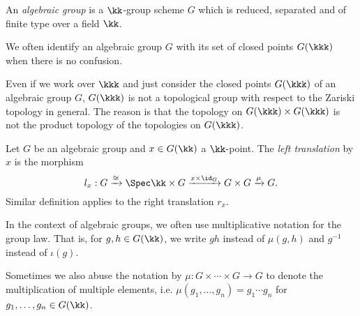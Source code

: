     \begin{definition}\label{def:algebraic_group}
        An \emph{algebraic group} is a \(\kk\)-group scheme \(G\) which is reduced, separated and of finite type over a field \(\kk\).
    \end{definition}

    \begin{remark}\label{rmk:algebraic_group_and_its_closed_points}
        We often identify an algebraic group \(G\) with its set of closed points \(G(\kkk)\) when there is no confusion.
    \end{remark}

    \begin{remark}\label{rmk:algebraic_group_is_not_topological_group}
        Even if we work over \(\kkk\) and just consider the closed points \(G(\kkk)\) of an algebraic group \(G\), \(G(\kkk)\) is not a topological group with respect to the Zariski topology in general.
        The reason is that the topology on \(G(\kkk) \times G(\kkk)\) is not the product topology of the topologies on \(G(\kkk)\).
    \end{remark}

    \begin{definition}\label{def:transition_morphism}
        Let \(G\) be an algebraic group and \(x \in G(\kk)\) a \(\kk\)-point.
        The \emph{left translation} by \(x\) is the morphism
        \[
            l_x: G \xrightarrow{\cong} \Spec \kk \times G \xrightarrow{x \times \id_G} G \times G \xrightarrow{\mu} G.
        \]
        Similar definition applies to the right translation \(r_x\).
    \end{definition}

    \begin{remark}\label{rmk:notation_of_multiplication_and_inverse}
        In the context of algebraic groups, we often use multiplicative notation for the group law.
        That is, for \(g,h \in G(\kk)\), we write \(gh\) instead of \(\mu(g,h)\) and \(g^{-1}\) instead of \(\iota(g)\).
        
        Sometimes we also abuse the notation by \(\mu:G \times \cdots \times G \to G\) to denote the multiplication of multiple elements, i.e. \(\mu(g_1,\ldots,g_n) = g_1 \cdots g_n\) for \(g_1,\ldots,g_n \in G(\kk)\).
    \end{remark}

